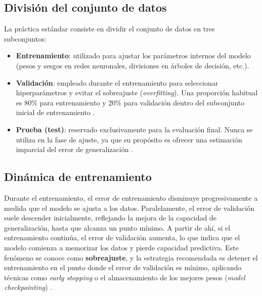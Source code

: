 \subsection*{División del conjunto de datos}
La práctica estándar consiste en dividir el conjunto de datos en tres subconjuntos:

\begin{itemize}
\item \textbf{Entrenamiento}: utilizado para ajustar los parámetros internos del modelo (pesos y sesgos en redes neuronales, divisiones en árboles de decisión, etc.).
\item \textbf{Validación}: empleado durante el entrenamiento para seleccionar hiperparámetros y evitar el sobreajuste (\textit{overfitting}). Una proporción habitual es 80\% para entrenamiento y 20\% para validación dentro del subconjunto inicial de entrenamiento \cite{Olivas2022}.
\item \textbf{Prueba (test)}: reservado exclusivamente para la evaluación final. Nunca se utiliza en la fase de ajuste, ya que su propósito es ofrecer una estimación imparcial del error de generalización \cite{Mostafa2012}.
\end{itemize}

\subsection*{Dinámica de entrenamiento}
Durante el entrenamiento, el error de entrenamiento disminuye progresivamente a medida que el modelo se ajusta a los datos. Paralelamente, el error de validación suele descender inicialmente, reflejando la mejora de la capacidad de generalización, hasta que alcanza un punto mínimo. A partir de ahí, si el entrenamiento continúa, el error de validación aumenta, lo que indica que el modelo comienza a memorizar los datos y pierde capacidad predictiva. Este fenómeno se conoce como \textbf{sobreajuste}, y la estrategia recomendada es detener el entrenamiento en el punto donde el error de validación es mínimo, aplicando técnicas como \textit{early stopping} o el almacenamiento de los mejores pesos (\textit{model checkpointing}) \cite{Olivas2022}.



